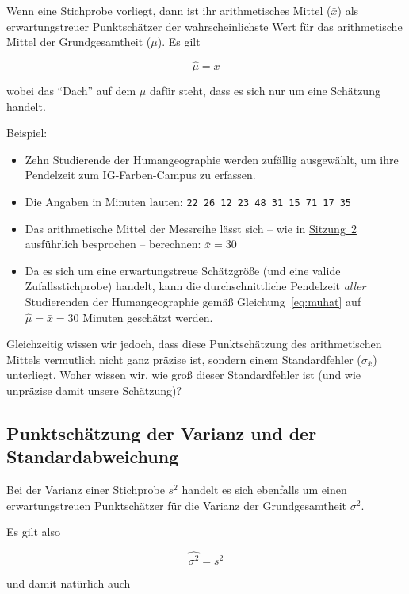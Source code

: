 \documentclass[
  11pt,
  ngerman,
  a4paper,
]{report}
\providecommand{\tightlist}{%
  \setlength{\itemsep}{0pt}\setlength{\parskip}{0pt}}
\begin{document}
Wenn eine Stichprobe vorliegt, dann ist ihr arithmetisches Mittel (\(\bar{x}\)) als erwartungstreuer Punktschätzer der wahrscheinlichste Wert für das arithmetische Mittel der Grundgesamtheit (\(\mu\)). Es gilt

\[
\hat{\mu} = \bar{x}
\label{eq:muhat}
\]

wobei das \enquote{Dach} auf dem \(\mu\) dafür steht, dass es sich nur um eine Schätzung handelt.

Beispiel:

\begin{itemize}
\tightlist
\item
  Zehn Studierende der Humangeographie werden zufällig ausgewählt, um ihre Pendelzeit zum IG-Farben-Campus zu erfassen.
\item
  Die Angaben in Minuten lauten:
  \texttt{22\ 26\ 12\ 23\ 48\ 31\ 15\ 71\ 17\ 35}
\item
  Das arithmetische Mittel der Messreihe lässt sich -- wie in \protect\hyperlink{arithmetisches-mittel}{Sitzung~2} ausführlich besprochen -- berechnen: \(\bar{x}=30\)
\item
  Da es sich um eine erwartungstreue Schätzgröße (und eine valide Zufallsstichprobe) handelt, kann die durchschnittliche Pendelzeit \emph{aller} Studierenden der Humangeographie gemäß Gleichung~\eqref{eq:muhat} auf \(\hat{\mu}=\bar{x}=30\) Minuten geschätzt werden.
\end{itemize}

Gleichzeitig wissen wir jedoch, dass diese Punktschätzung des arithmetischen Mittels vermutlich nicht ganz präzise ist, sondern einem Standardfehler (\(\sigma_{\bar{x}}\)) unterliegt. Woher wissen wir, wie groß dieser Standardfehler ist (und wie unpräzise damit unsere Schätzung)?

\hypertarget{punktschuxe4tzung-der-varianz-und-der-standardabweichung}{%
\subsection{Punktschätzung der Varianz und der Standardabweichung}\label{punktschuxe4tzung-der-varianz-und-der-standardabweichung}}

Bei der Varianz einer Stichprobe \(s^2\) handelt es sich ebenfalls um einen erwartungstreuen Punktschätzer für die Varianz der Grundgesamtheit \(\sigma^2\).

Es gilt also

\[
\hat{\sigma^2} = s^2 \label{eq:varhat}
\]

und damit natürlich auch
\end{document}
